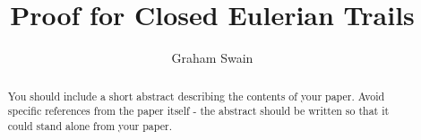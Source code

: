 \documentclass[10pt]{amsart}
\begin{document}
\parskip10pt
\parindent12pt
\baselineskip16pt






\def\G{\widetilde{G}}
\def\B{\widetilde{B}}
\def\T{\widetilde{T}}
\def\C{\mathbb{C}}
\def\A{\mathbb{A}}
\def\Z{\mathbb{Z}}
\def\R{\mathbb{R}}
\def\Q{\mathbb{Q}}
\def\N{\mathbb{N}}
\def\C{\mathbb{C}}
\def\F{\mathbb{F}}
\def\I{\mathbb{I}}
\def\H{\mathcal{H}}
\def\e{\varepsilon}
\def\s{\underline s}
\def\z{\zeta }
\def\vp{\varpi }
\def\O{\mathcal O}
\def\v{\upsilon }
\def\U{\Upsilon }
\def\p{\wp }
\def\p{\mathfrak{p}}
\def\B{\mathfrak{B}}

\newtheorem{theorem}{Theorem}%
\newtheorem{lemma}[theorem]{Lemma}













\title{Proof for Closed Eulerian Trails}

\author{Graham Swain}




\begin{abstract}
You should include a short abstract describing the contents of your paper.  Avoid specific references from the paper itself - the abstract should be written so that it could stand alone from your paper.\end{abstract}
\end{document}
